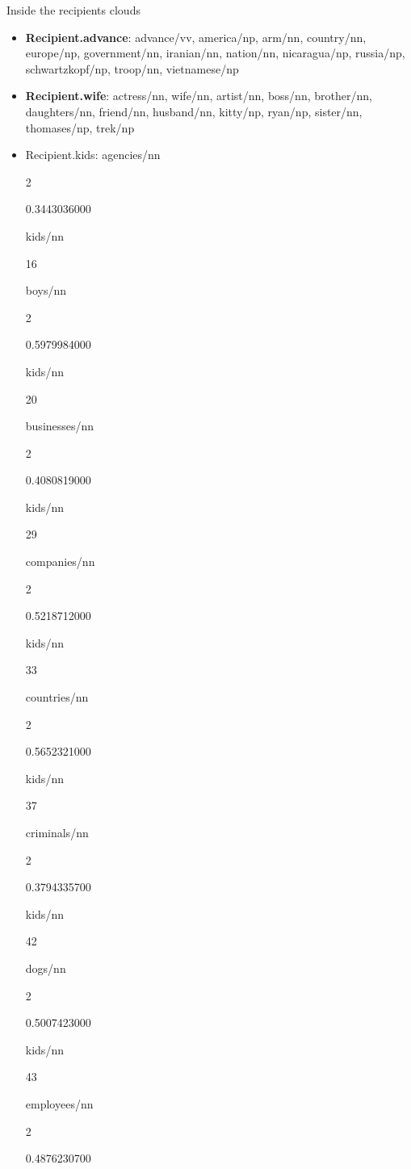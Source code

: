 \documentclass[
  ignorenonframetext,
]{beamer}
\begin{document}
\begin{frame}{Inside the recipients clouds}
\protect\hypertarget{inside-the-recipients-clouds}{}
\begin{itemize}
\item
  \textbf{Recipient.advance}: advance/vv, america/np, arm/nn,
  country/nn, europe/np, government/nn, iranian/nn, nation/nn,
  nicaragua/np, russia/np, schwartzkopf/np, troop/nn, vietnamese/np
\item
  \textbf{Recipient.wife}: actress/nn, wife/nn, artist/nn, boss/nn,
  brother/nn, daughters/nn, friend/nn, husband/nn, kitty/np, ryan/np,
  sister/nn, thomases/np, trek/np
\item
  Recipient.kids: agencies/nn

  2

  0.3443036000

  kids/nn

  16

  boys/nn

  2

  0.5979984000

  kids/nn

  20

  businesses/nn

  2

  0.4080819000

  kids/nn

  29

  companies/nn

  2

  0.5218712000

  kids/nn

  33

  countries/nn

  2

  0.5652321000

  kids/nn

  37

  criminals/nn

  2

  0.3794335700

  kids/nn

  42

  dogs/nn

  2

  0.5007423000

  kids/nn

  43

  employees/nn

  2

  0.4876230700


\end{itemize}
\end{frame}
\end{document}
